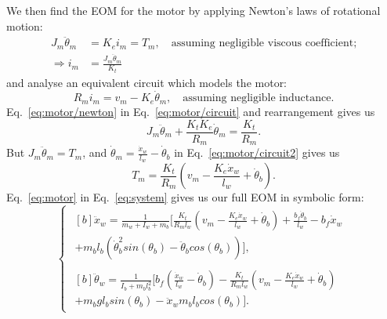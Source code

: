 \documentclass[11pt]{article} %
\begin{document}
We then find the \ac{EOM} for the motor by applying Newton's laws of rotational motion:
\begin{align}
  J_m \ddot{\theta}_m &= K_e i_m = T_m, \quad \text{assuming negligible viscous coefficient;}\nonumber \\
  \Rightarrow i_m &= \frac{J_m \ddot{\theta}_m}{K_t}\label{eq:motor/newton}
\end{align}
and analyse an equivalent circuit which models the motor:
\begin{equation}\label{eq:motor/circuit}
R_m i_m = v_m - K_e \dot{\theta}_m, \quad \text{assuming negligible inductance.}
\end{equation}
Eq.~\eqref{eq:motor/newton} in Eq.~\eqref{eq:motor/circuit} and rearrangement gives us
\begin{equation}\label{eq:motor/circuit2}
  J_m \ddot{\theta}_m
  + \frac{K_t K_e}{R_m} \dot{\theta}_m
  = \frac{K_t}{R_m}.
\end{equation}
But $J_m \ddot{\theta}_m = T_m$, and $\dot{\theta}_m = \frac{\dot{x}_w}{l_w} - \dot{\theta}_b$ in Eq.~\eqref{eq:motor/circuit2} gives us
\begin{equation}\label{eq:motor}
  T_m = \frac{K_t}{R_m}\left(
    v_m
    - \frac{K_e \dot{x}_w}{l_w}
    + \dot{\theta}_b
  \right).
\end{equation}
Eq.~\eqref{eq:motor} in Eq.~\eqref{eq:system} gives us our full \ac{EOM} in symbolic form:
\begin{equation}
  \begin{cases}
    \begin{aligned}[b]
      \ddot{x}_w =
      \frac{1}{m_w + I_w + m_b}\bigg[
      \frac{K_t}{R_m l_w}\left(
        v_m
        - \frac{K_e \dot{x}_w}{l_w}
        + \dot{\theta}_b
      \right)
      + \frac{b_f \dot{\theta}_b}{l_w}
      - b_f \dot{x}_w\\
      + m_b l_b \left(
        \dot{\theta}^2_b sin(\theta_b)
        - \ddot{\theta}_b cos(\theta_b)
      \right)
      \bigg],
    \end{aligned}\\[1em]
  \begin{aligned}[b]
    \ddot{\theta}_w =
    \frac{1}{I_b + m_b l_b^2}\bigg[
      b_f\left(
        \frac{\dot{x}_w}{l_w}
        - \dot{\theta}_b
      \right)
      - \frac{K_t}{R_m l_w}\left(
        v_m
        - \frac{K_e \dot{x}_w}{l_w}
        + \dot{\theta}_b
      \right)\\
      + m_b g l_b sin(\theta_b)
      - \ddot{x}_w m_b l_b cos(\theta_b)
    \bigg].
    \end{aligned}
  \end{cases}
\end{equation}
\end{document}
